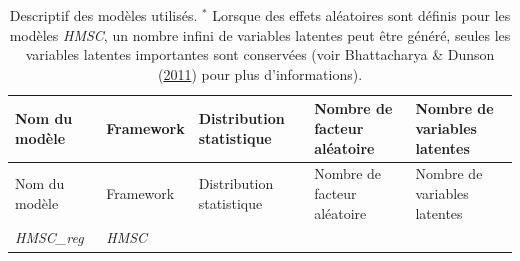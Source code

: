 \documentclass[12pt,]{article}
\begin{document}
{\small
\begin{longtable}[]{@{}lllll@{}}
\caption{Descriptif des modèles utilisés. \(^*\) Lorsque des effets
aléatoires sont définis pour les modèles \emph{HMSC}, un nombre infini
de variables latentes peut être généré, seules les variables latentes
importantes sont conservées (voir Bhattacharya \& Dunson
(\protect\hyperlink{ref-Bhattacharya_2011}{2011}) pour plus
d'informations). \label{tbl:summarymod}}\tabularnewline
\toprule
\begin{minipage}[b]{0.11\columnwidth}\raggedright
Nom du modèle\strut
\end{minipage} & \begin{minipage}[b]{0.09\columnwidth}\raggedright
Framework\strut
\end{minipage} & \begin{minipage}[b]{0.19\columnwidth}\raggedright
Distribution statistique\strut
\end{minipage} & \begin{minipage}[b]{0.24\columnwidth}\raggedright
Nombre de facteur aléatoire\strut
\end{minipage} & \begin{minipage}[b]{0.22\columnwidth}\raggedright
Nombre de variables latentes\strut
\end{minipage}\tabularnewline
\midrule
\endfirsthead
\toprule
\begin{minipage}[b]{0.11\columnwidth}\raggedright
Nom du modèle\strut
\end{minipage} & \begin{minipage}[b]{0.09\columnwidth}\raggedright
Framework\strut
\end{minipage} & \begin{minipage}[b]{0.19\columnwidth}\raggedright
Distribution statistique\strut
\end{minipage} & \begin{minipage}[b]{0.24\columnwidth}\raggedright
Nombre de facteur aléatoire\strut
\end{minipage} & \begin{minipage}[b]{0.22\columnwidth}\raggedright
Nombre de variables latentes\strut
\end{minipage}\tabularnewline
\midrule
\endhead
\begin{minipage}[t]{0.11\columnwidth}\raggedright
\emph{HMSC\_reg}\strut
\end{minipage} & \begin{minipage}[t]{0.09\columnwidth}\raggedright
\emph{HMSC}\strut
\end{minipage} & \begin{minipage}[t]{0.19\columnwidth}\raggedright

\end{minipage}
\end{longtable}}
\end{document}
